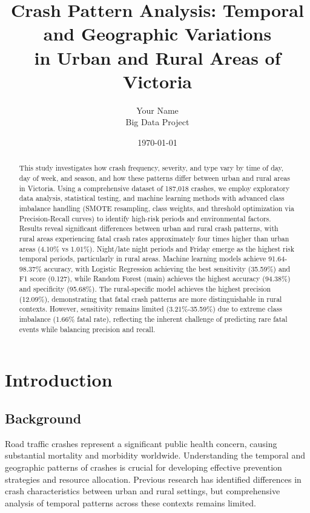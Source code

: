 \documentclass[12pt,a4paper]{article}
\title{Crash Pattern Analysis: Temporal and Geographic Variations\\
in Urban and Rural Areas of Victoria}
\author{Your Name\\
Big Data Project}
\date{\today}
\begin{document}
\maketitle

\begin{abstract}
This study investigates how crash frequency, severity, and type vary by time of day, day of week, and season, and how these patterns differ between urban and rural areas in Victoria. Using a comprehensive dataset of 187,018 crashes, we employ exploratory data analysis, statistical testing, and machine learning methods with advanced class imbalance handling (SMOTE resampling, class weights, and threshold optimization via Precision-Recall curves) to identify high-risk periods and environmental factors. Results reveal significant differences between urban and rural crash patterns, with rural areas experiencing fatal crash rates approximately four times higher than urban areas (4.10\% vs 1.01\%). Night/late night periods and Friday emerge as the highest risk temporal periods, particularly in rural areas. Machine learning models achieve 91.64-98.37\% accuracy, with Logistic Regression achieving the best sensitivity (35.59\%) and F1 score (0.127), while Random Forest (main) achieves the highest accuracy (94.38\%) and specificity (95.68\%). The rural-specific model achieves the highest precision (12.09\%), demonstrating that fatal crash patterns are more distinguishable in rural contexts. However, sensitivity remains limited (3.21\%-35.59\%) due to extreme class imbalance (1.66\% fatal rate), reflecting the inherent challenge of predicting rare fatal events while balancing precision and recall.
\end{abstract}

\tableofcontents
\newpage

\section{Introduction}

\subsection{Background}
Road traffic crashes represent a significant public health concern, causing substantial mortality and morbidity worldwide. Understanding the temporal and geographic patterns of crashes is crucial for developing effective prevention strategies and resource allocation. Previous research has identified differences in crash characteristics between urban and rural settings, but comprehensive analysis of temporal patterns across these contexts remains limited.
\end{document}
